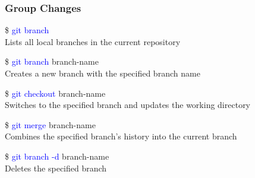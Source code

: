 \documentclass[aspectratio=169]{beamer}
\begin{document}
\begin{frame}

\frametitle{Group Changes}

\$ \textcolor{blue}{git branch}\\
Lists all local branches in the current repository

\$ \textcolor{blue}{git branch} branch-name\\
Creates a new branch with the specified branch name

\$ \textcolor{blue}{git checkout} branch-name\\
Switches to the specified branch and updates the working directory

\$ \textcolor{blue}{git merge} branch-name\\
Combines the specified branch's history into the current branch

\$ \textcolor{blue}{git branch -d} branch-name\\
Deletes the specified branch

\end{frame}



\end{document}
